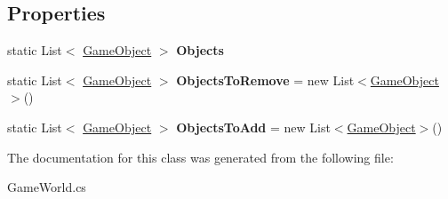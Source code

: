 \subsection*{Properties}
\begin{DoxyCompactItemize}
\item 
\hypertarget{class_mage_twinstick_1_1_game_world_aa08512629d71365bea26ea059020f4ca}{}static List$<$ \hyperlink{class_mage_twinstick_1_1_game_object}{Game\+Object} $>$ {\bfseries Objects}\label{class_mage_twinstick_1_1_game_world_aa08512629d71365bea26ea059020f4ca}

\item 
\hypertarget{class_mage_twinstick_1_1_game_world_af930b76068ef6637bb77fdcfd877a8f1}{}static List$<$ \hyperlink{class_mage_twinstick_1_1_game_object}{Game\+Object} $>$ {\bfseries Objects\+To\+Remove} = new List$<$\hyperlink{class_mage_twinstick_1_1_game_object}{Game\+Object}$>$()\label{class_mage_twinstick_1_1_game_world_af930b76068ef6637bb77fdcfd877a8f1}

\item 
\hypertarget{class_mage_twinstick_1_1_game_world_a70ecede9da55d25220e0f524f760bcff}{}static List$<$ \hyperlink{class_mage_twinstick_1_1_game_object}{Game\+Object} $>$ {\bfseries Objects\+To\+Add} = new List$<$\hyperlink{class_mage_twinstick_1_1_game_object}{Game\+Object}$>$()\label{class_mage_twinstick_1_1_game_world_a70ecede9da55d25220e0f524f760bcff}

\end{DoxyCompactItemize}


The documentation for this class was generated from the following file\+:\begin{DoxyCompactItemize}
\item 
Game\+World.\+cs\end{DoxyCompactItemize}
